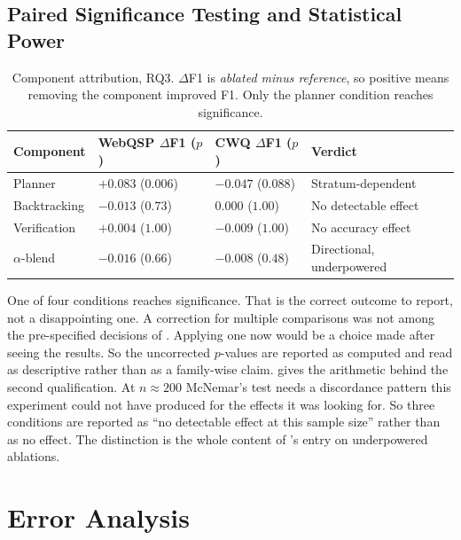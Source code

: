 \subsection{Paired Significance Testing and Statistical Power}

\begin{table}[!tb]
  \begin{center}
    \caption[Component attribution]{Component attribution, RQ3. $\Delta$F1 is
    \emph{ablated minus reference}, so positive means removing the component
    improved F1. Only the planner condition reaches significance.}
    \label{tab:rq3}
    \small
    \begin{tabular}{|l|l|l|l|}
      \hline
      \textbf{Component} & \textbf{WebQSP $\Delta$F1 ($p$)} & \textbf{CWQ
      $\Delta$F1 ($p$)} & \textbf{Verdict} \\
      \hline
      Planner & $+0.083$ ($0.006$) & $-0.047$ ($0.088$) & Stratum-dependent \\
      Backtracking & $-0.013$ ($0.73$) & $0.000$ ($1.00$) & No detectable effect
        \\
      Verification & $+0.004$ ($1.00$) & $-0.009$ ($1.00$) & No accuracy effect
        \\
      $\alpha$-blend & $-0.016$ ($0.66$) & $-0.008$ ($0.48$) & Directional,
        underpowered \\
      \hline
    \end{tabular}
  \end{center}
\end{table}

One of four conditions reaches significance. That is the correct outcome to
report, not a disappointing one. A correction for multiple comparisons was not
among the pre-specified decisions of . Applying one
now would be a choice made after seeing the results. So the uncorrected
$p$-values are reported as computed and read as descriptive rather than as a
family-wise claim.  gives the arithmetic behind the second
qualification. At $n \approx 200$ McNemar's test needs a discordance pattern
this experiment could not have produced for the effects it was looking for. So
three conditions are reported as ``no detectable effect at this sample size''
rather than as no effect. The distinction is the whole content of
's entry on underpowered ablations.

\section{Error Analysis}\label{sec:erroranalysis}

